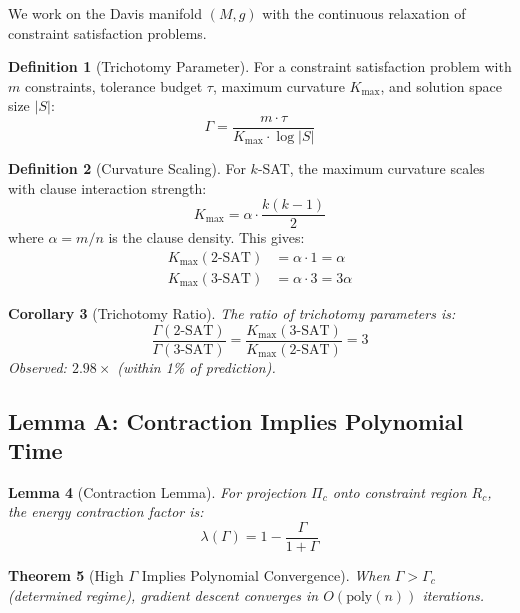\documentclass[11pt,a4paper]{article}
\theoremstyle{plain}
\newtheorem{theorem}{Theorem}[section]
\newtheorem{lemma}[theorem]{Lemma}
\newtheorem{corollary}[theorem]{Corollary}
\theoremstyle{definition}
\newtheorem{definition}[theorem]{Definition}
\theoremstyle{remark}
\begin{document}
We work on the Davis manifold $(M, g)$ with the continuous relaxation of constraint satisfaction problems.

\begin{definition}[Trichotomy Parameter]
For a constraint satisfaction problem with $m$ constraints, tolerance budget $\tau$, maximum curvature $K_{\max}$, and solution space size $|S|$:
\begin{equation}
    \Gamma = \frac{m \cdot \tau}{K_{\max} \cdot \log|S|}
\end{equation}
\end{definition}

\begin{definition}[Curvature Scaling]
For $k$-SAT, the maximum curvature scales with clause interaction strength:
\begin{equation}
    K_{\max} = \alpha \cdot \frac{k(k-1)}{2}
\end{equation}
where $\alpha = m/n$ is the clause density. This gives:
\begin{align}
    K_{\max}(\text{2-SAT}) &= \alpha \cdot 1 = \alpha \\
    K_{\max}(\text{3-SAT}) &= \alpha \cdot 3 = 3\alpha
\end{align}
\end{definition}

\begin{corollary}[Trichotomy Ratio]
The ratio of trichotomy parameters is:
\begin{equation}
    \frac{\Gamma(\text{2-SAT})}{\Gamma(\text{3-SAT})} = \frac{K_{\max}(\text{3-SAT})}{K_{\max}(\text{2-SAT})} = 3
\end{equation}
Observed: $2.98\times$ (within 1\% of prediction).
\end{corollary}

\subsection{Lemma A: Contraction Implies Polynomial Time}

\begin{lemma}[Contraction Lemma]\label{lem:contraction_formal}
For projection $\Pi_c$ onto constraint region $R_c$, the energy contraction factor is:
\begin{equation}
    \lambda(\Gamma) = 1 - \frac{\Gamma}{1 + \Gamma}
\end{equation}
\end{lemma}

\begin{theorem}[High $\Gamma$ Implies Polynomial Convergence]\label{thm:high_gamma}
When $\Gamma > \Gamma_c$ (determined regime), gradient descent converges in $O(\text{poly}(n))$ iterations.
\end{theorem}
\end{document}
